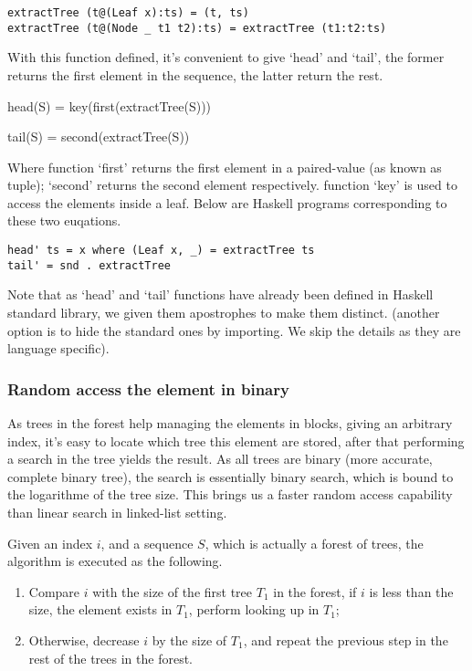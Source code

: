 \documentclass{article}
\begin{document}
\begin{lstlisting}
extractTree (t@(Leaf x):ts) = (t, ts)
extractTree (t@(Node _ t1 t2):ts) = extractTree (t1:t2:ts)
\end{lstlisting}

With this function defined, it's convenient to give `head' and `tail', the former returns
the first element in the sequence, the latter return the rest.

\be
head(S) = key(first(extractTree(S)))
\ee

\be
tail(S) = second(extractTree(S))
\ee

Where function `first' returns the first element in a paired-value (as known as tuple); 
`second' returns the second element respectively. function `key' is used to access the
elements inside a leaf. Below are Haskell programs corresponding to these two euqations.

\begin{lstlisting}
head' ts = x where (Leaf x, _) = extractTree ts
tail' = snd . extractTree
\end{lstlisting}

Note that as `head' and `tail' functions have already been defined in Haskell standard
library, we given them apostrophes to make them distinct. (another option is to hide
the standard ones by importing. We skip the details as they are language specific).

\subsubsection{Random access the element in binary}

As trees in the forest help managing the elements in blocks, giving an arbitrary index,
it's easy to locate which tree this element are stored, after that performing a search 
in the tree yields the result. As all trees are binary (more accurate, complete binary
tree), the search is essentially binary search, which is bound to the logarithme
of the tree size. This brings us a faster random access capability than linear search
in linked-list setting.

Given an index $i$, and a sequence $S$, which is actually a forest of trees, the 
algorithm is executed as the following.

\begin{enumerate}
\item Compare $i$ with the size of the first tree $T_1$ in the forest, if $i$ is 
less than the size, the element exists in $T_1$, perform looking up in $T_1$;
\item Otherwise, decrease $i$ by the size of $T_1$, and repeat the previous step
in the rest of the trees in the forest.
\end{enumerate}
\end{document}

